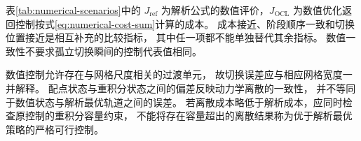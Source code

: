 表\ref{tab:numerical-scenarios}中的 $J_{\mathrm{ref}}$
为解析公式的数值评价，$J_{\mathrm{OCL}}$
为数值优化返回控制按式\eqref{eq:numerical-cost-sum}计算的成本。
成本接近、阶段顺序一致和切换位置接近是相互补充的比较指标，
其中任一项都不能单独替代其余指标。
数值一致性不要求孤立切换瞬间的控制代表值相同。

数值控制允许存在与网格尺度相关的过渡单元，
故切换误差应与相应网格宽度一并解释。
配点状态与重积分状态之间的偏差反映动力学离散的一致性，
并不等同于数值状态与解析最优轨道之间的误差。
若离散成本略低于解析成本，应同时检查原控制的重积分容量约束，
不能将存在容量超出的离散结果称为优于解析最优策略的严格可行控制。

\NumFindingParagraph{\NumOverallFinding}

